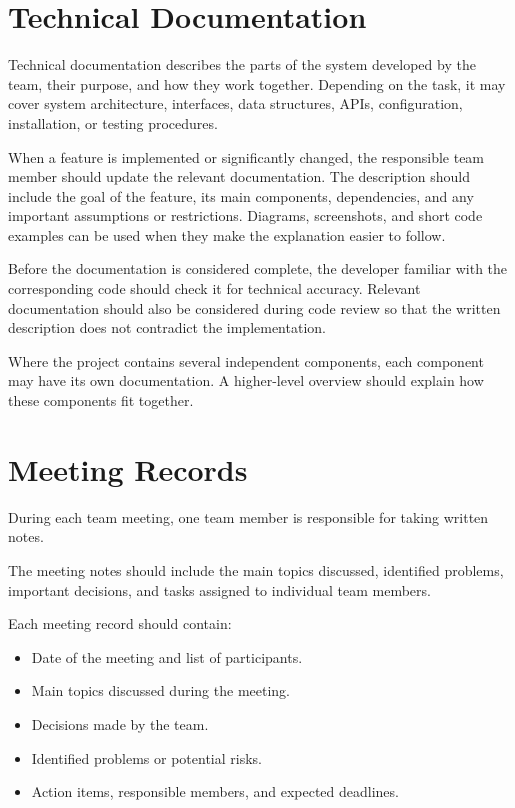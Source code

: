 \documentclass[12pt,a4paper]{article}
\begin{document}
\section{Technical Documentation}

Technical documentation describes the parts of the system developed by the
team, their purpose, and how they work together. Depending on the task,
it may cover system architecture, interfaces, data structures, APIs,
configuration, installation, or testing procedures.

When a feature is implemented or significantly changed, the responsible team
member should update the relevant documentation. The description should
include the goal of the feature, its main components, dependencies, and any
important assumptions or restrictions. Diagrams, screenshots, and short code
examples can be used when they make the explanation easier to follow.

Before the documentation is considered complete, the developer familiar with
the corresponding code should check it for technical accuracy. Relevant
documentation should also be considered during code review so that the
written description does not contradict the implementation.

Where the project contains several independent components, each component
may have its own documentation. A higher-level overview should explain how
these components fit together.



\section{Meeting Records}

During each team meeting, one team member is
responsible for taking written notes. 

The meeting notes should include the main topics
discussed, identified problems, important decisions,
and tasks assigned to individual team members.

Each meeting record should contain:
\begin{itemize}
    \item Date of the meeting and list of participants.
    \item Main topics discussed during the meeting.
    \item Decisions made by the team.
    \item Identified problems or potential risks.
    \item Action items, responsible members,
          and expected deadlines.
\end{itemize}
\end{document}
